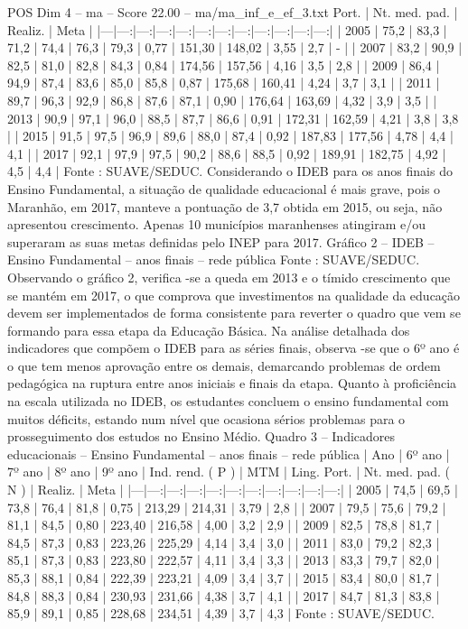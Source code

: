 \begin{textsample}{POS Dim 4 – ma – Score 22.00 – ma/ma\_inf\_e\_ef\_3.txt}
Port. | Nt. med. pad. | Realiz. | Meta | |---|---:|---:|---:|---:|---:|---:|---:|---:|---:|---:|---:| | 2005 | 75,2 | 83,3 | 71,2 | 74,4 | 76,3 | 79,3 | 0,77 | 151,30 | 148,02 | 3,55 | 2,7 | - | | 2007 | 83,2 | 90,9 | 82,5 | 81,0 | 82,8 | 84,3 | 0,84 | 174,56 | 157,56 | 4,16 | 3,5 | 2,8 | | 2009 | 86,4 | 94,9 | 87,4 | 83,6 | 85,0 | 85,8 | 0,87 | 175,68 | 160,41 | 4,24 | 3,7 | 3,1 | | 2011 | 89,7 | 96,3 | 92,9 | 86,8 | 87,6 | 87,1 | 0,90 | 176,64 | 163,69 | 4,32 | 3,9 | 3,5 | | 2013 | 90,9 | 97,1 | 96,0 | 88,5 | 87,7 | 86,6 | 0,91 | 172,31 | 162,59 | 4,21 | 3,8 | 3,8 | | 2015 | 91,5 | 97,5 | 96,9 | 89,6 | 88,0 | 87,4 | 0,92 | 187,83 | 177,56 | 4,78 | 4,4 | 4,1 | | 2017 | 92,1 | 97,9 | 97,5 | 90,2 | 88,6 | 88,5 | 0,92 | 189,91 | 182,75 | 4,92 | 4,5 | 4,4 | Fonte : SUAVE/SEDUC.
Considerando o IDEB para os anos finais do Ensino Fundamental, a situação de qualidade educacional é mais grave, pois o Maranhão, em 2017, manteve a pontuação de 3,7 obtida em 2015, ou seja, não apresentou crescimento.
Apenas 10 municípios maranhenses atingiram e/ou superaram as suas metas definidas pelo INEP para 2017.
Gráfico 2 – IDEB – Ensino Fundamental – anos finais – rede pública Fonte : SUAVE/SEDUC.
Observando o gráfico 2, verifica -se a queda em 2013 e o tímido crescimento que se mantém em 2017, o que comprova que investimentos na qualidade da educação devem ser implementados de forma consistente para reverter o quadro que vem se formando para essa etapa da Educação Básica.
Na análise detalhada dos indicadores que compõem o IDEB para as séries finais, observa -se que o 6º ano é o que tem menos aprovação entre os demais, demarcando problemas de ordem pedagógica na ruptura entre anos iniciais e finais da etapa.
Quanto à proficiência na escala utilizada no IDEB, os estudantes concluem o ensino fundamental com muitos déficits, estando num nível que ocasiona sérios problemas para o prosseguimento dos estudos no Ensino Médio.
Quadro 3 – Indicadores educacionais – Ensino Fundamental – anos finais – rede pública | Ano | 6º ano | 7º ano | 8º ano | 9º ano | Ind. rend. ( P ) | MTM | Ling.
Port. | Nt. med. pad. ( N ) | Realiz. | Meta | |---|---:|---:|---:|---:|---:|---:|---:|---:|---:|---:| | 2005 | 74,5 | 69,5 | 73,8 | 76,4 | 81,8 | 0,75 | 213,29 | 214,31 | 3,79 | 2,8 | | 2007 | 79,5 | 75,6 | 79,2 | 81,1 | 84,5 | 0,80 | 223,40 | 216,58 | 4,00 | 3,2 | 2,9 | | 2009 | 82,5 | 78,8 | 81,7 | 84,5 | 87,3 | 0,83 | 223,26 | 225,29 | 4,14 | 3,4 | 3,0 | | 2011 | 83,0 | 79,2 | 82,3 | 85,1 | 87,3 | 0,83 | 223,80 | 222,57 | 4,11 | 3,4 | 3,3 | | 2013 | 83,3 | 79,7 | 82,0 | 85,3 | 88,1 | 0,84 | 222,39 | 223,21 | 4,09 | 3,4 | 3,7 | | 2015 | 83,4 | 80,0 | 81,7 | 84,8 | 88,3 | 0,84 | 230,93 | 231,66 | 4,38 | 3,7 | 4,1 | | 2017 | 84,7 | 81,3 | 83,8 | 85,9 | 89,1 | 0,85 | 228,68 | 234,51 | 4,39 | 3,7 | 4,3 | Fonte : SUAVE/SEDUC.

\end{textsample}
